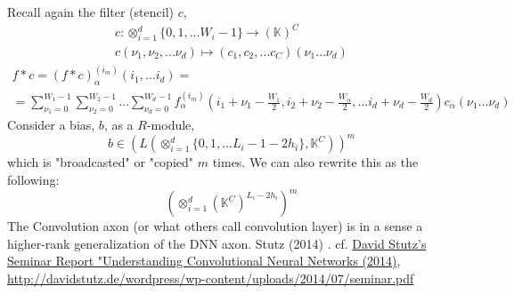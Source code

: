 \documentclass[10pt]{amsart}
\begin{document}
\begin{multicols*}{2}
Recall again the filter (stencil) $c$, 
\begin{equation}
\begin{gathered}
c: \otimes_{i=1}^d \lbrace 0 ,1,\dots W_i -1\rbrace \to (\mathbb{K})^C  \\
c(\nu_1, \nu_2 ,\dots \nu_d) \mapsto (c_1,c_2, \dots c_C)(\nu_1\dots \nu_d) 
\end{gathered}
\end{equation}
\begin{equation}
\begin{gathered}
f*c = (f*c)_{\alpha}^{(i_m)}(i_1,\dots i_d) = \\
= \sum_{\nu_1=0}^{W_1-1} \sum_{\nu_2=0}^{W_2-1} \dots \sum_{\nu_d=0}^{W_d-1} f_{\alpha}^{(i_m)}(i_1 + \nu_1 - \frac{W_1}{2}, i_2 + \nu_2 - \frac{W_{\alpha}}{2}, \dots i_d + \nu_d - \frac{W_d}{2}) c_{\alpha}(\nu_1 \dots \nu_d)
\end{gathered}
\end{equation}
Consider a bias, $b$, as a $R$-module, 
\[
b \in \left( L (\otimes_{i=1}^d \lbrace 0 ,1, \dots L_i - 1 - 2h_i \rbrace , \mathbb{K}^C) \right)^m
\]
which is "broadcasted" or "copied" $m$ times.  
We can also rewrite this as the following:
\[
\left( \otimes_{i=1}^d ( \mathbb{K}^C)^{L_i - 2h_i} \right)^m  
\]
The Convolution axon (or what others call convolution layer) is in a sense a higher-rank generalization of the DNN axon.  Stutz (2014) \cite{Stut2014}.  
cf. \href{http://davidstutz.de/wordpress/wp-content/uploads/2014/07/seminar.pdf}{David Stutz's Seminar Report "Understanding Convolutional Neural Networks (2014)}, \url{http://davidstutz.de/wordpress/wp-content/uploads/2014/07/seminar.pdf}






\end{multicols*}
\end{document}
